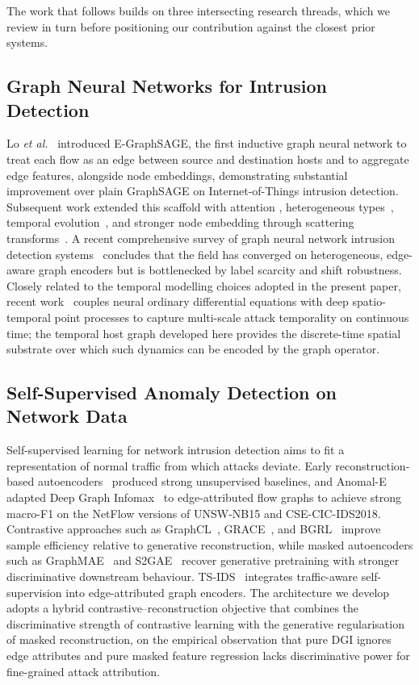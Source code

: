 \documentclass{ieeeaccess}
\begin{document}
The work that follows builds on three intersecting research threads, which
we review in turn before positioning our contribution against the closest
prior systems.

\subsection{Graph Neural Networks for Intrusion Detection}
Lo \emph{et al.}~\cite{lo2022egraphsage} introduced E-GraphSAGE, the first
inductive graph neural network to treat each flow as an edge between source
and destination hosts and to aggregate edge features, alongside node
embeddings, demonstrating substantial improvement over plain GraphSAGE
\cite{hamilton2017graphsage} on Internet-of-Things intrusion detection.
Subsequent work extended this scaffold with attention
\cite{caville2022anomale}, heterogeneous types~\cite{hu2020hgt}, temporal
evolution~\cite{rossi2020tgn}, and stronger node embedding through scattering
transforms~\cite{bilot2023survey}. A recent comprehensive survey of graph
neural network intrusion detection systems~\cite{bilot2023survey}
concludes that the field has converged on heterogeneous, edge-aware graph
encoders but is bottlenecked by label scarcity and shift robustness.
Closely related to the temporal modelling choices adopted in the present
paper, recent work~\cite{anaedevha2026neuralode} couples neural ordinary
differential equations with deep spatio-temporal point processes to capture
multi-scale attack temporality on continuous time; the temporal host graph
developed here provides the discrete-time spatial substrate over which such
dynamics can be encoded by the graph operator.

\subsection{Self-Supervised Anomaly Detection on Network Data}
Self-supervised learning for network intrusion detection aims to fit a
representation of normal traffic from which attacks deviate. Early
reconstruction-based autoencoders~\cite{mirsky2018kitsune} produced strong
unsupervised baselines, and Anomal-E~\cite{caville2022anomale} adapted Deep
Graph Infomax~\cite{velickovic2019dgi} to edge-attributed flow graphs to
achieve strong macro-F1 on the NetFlow versions of UNSW-NB15 and
CSE-CIC-IDS2018. Contrastive
approaches such as GraphCL~\cite{you2020graphcl}, GRACE~\cite{zhu2020grace},
and BGRL~\cite{thakoor2022bgrl} improve sample efficiency relative to
generative reconstruction, while masked autoencoders such as
GraphMAE~\cite{hou2022graphmae} and S2GAE~\cite{tan2023s2gae} recover
generative pretraining with stronger discriminative downstream behaviour.
TS-IDS~\cite{nguyen2023tsids} integrates traffic-aware self-supervision into
edge-attributed graph encoders. The architecture we develop adopts a
hybrid contrastive--reconstruction objective that combines the discriminative
strength of contrastive learning with the generative regularisation of
masked reconstruction, on the empirical observation that pure DGI ignores
edge attributes and pure masked feature regression lacks discriminative
power for fine-grained attack attribution.
\end{document}
